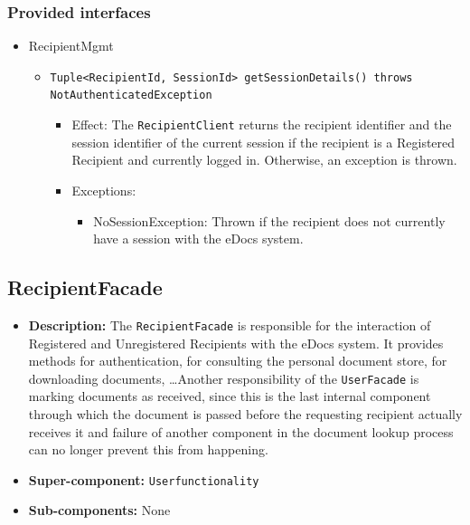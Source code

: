 \documentclass[a4paper,10pt]{article}
\begin{document}
\subsubsection*{Provided interfaces}
\begin{itemize}
    \item RecipientMgmt
    \begin{itemize}
        \item \texttt{Tuple<RecipientId, SessionId> getSessionDetails() throws NotAuthenticatedException}
        \begin{itemize}
            \item Effect: The \texttt{RecipientClient} returns the recipient identifier and the session identifier of the current session if the recipient is a Registered Recipient and currently logged in. Otherwise, an exception is thrown.
            \item Exceptions:
            \begin{itemize}
                \item NoSessionException: Thrown if the recipient does not currently have a session with the eDocs system.
            \end{itemize}
		\end{itemize}

    \end{itemize}
\end{itemize}



\subsection{RecipientFacade}
\begin{itemize}
    \item \textbf{Description:} The \texttt{RecipientFacade} is responsible for the interaction of Registered and Unregistered Recipients with the eDocs system. It provides methods for authentication, for consulting the personal document store, for downloading documents, \dots Another responsibility of the \texttt{UserFacade} is marking documents as received, since this is the last internal component through which the document is passed before the requesting recipient actually receives it and failure of another component in the document lookup process can no longer prevent this from happening.
    \item \textbf{Super-component:} \texttt{Userfunctionality}
    \item \textbf{Sub-components:} None
\end{itemize}
\end{document}
